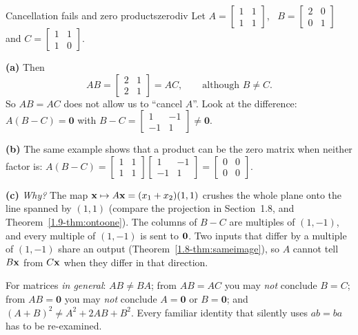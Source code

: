 \documentclass[11pt]{article}
\begin{document}
\begin{exmp}{Cancellation fails and zero products}{zerodiv}
Let $A=\begin{bmatrix}1&1\\1&1\end{bmatrix}$, \ $B=\begin{bmatrix}2&0\\0&1\end{bmatrix}$ and $C=\begin{bmatrix}1&1\\1&0\end{bmatrix}$.

\textbf{(a)} Then
\[
AB=\begin{bmatrix}2&1\\2&1\end{bmatrix}=AC,\qquad\text{although } B\neq C.
\]
So $AB=AC$ does not allow us to ``cancel $A$''. Look at the difference: $A(B-C)=\mathbf{0}$ with $B-C=\begin{bmatrix}1&-1\\-1&1\end{bmatrix}\neq\mathbf{0}$.

\textbf{(b)} The same example shows that a product can be the zero matrix when neither factor is: $A(B-C)=\begin{bmatrix}1&1\\1&1\end{bmatrix}\begin{bmatrix}1&-1\\-1&1\end{bmatrix}=\begin{bmatrix}0&0\\0&0\end{bmatrix}$.

\textbf{(c)} \emph{Why?} The map $\mathbf{x}\mapsto A\mathbf{x}=(x_1+x_2)(1,1)$ crushes the whole plane onto the line spanned by $(1,1)$ (compare the projection in Section~1.8, and Theorem~\ref{1.9-thm:ontoone}). The columns of $B-C$ are multiples of $(1,-1)$, and every multiple of $(1,-1)$ is sent to $\mathbf{0}$. Two inputs that differ by a multiple of $(1,-1)$ share an output (Theorem~\ref{1.8-thm:sameimage}), so $A$ cannot tell $B\mathbf{x}$ from $C\mathbf{x}$ when they differ in that direction.
\end{exmp}

\begin{warn}
For matrices \emph{in general}: $AB\neq BA$; from $AB=AC$ you may \emph{not} conclude $B=C$; from $AB=\mathbf{0}$ you may \emph{not} conclude $A=\mathbf{0}$ or $B=\mathbf{0}$; and $(A+B)^2\neq A^2+2AB+B^2$. Every familiar identity that silently uses $ab=ba$ has to be re-examined.
\end{warn}
\end{document}
